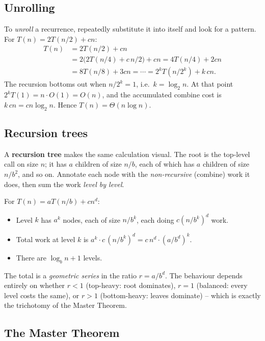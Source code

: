 \documentclass[11pt]{article}
\begin{document}
\subsection{Unrolling}

To \emph{unroll} a recurrence, repeatedly substitute it into itself and look for a pattern.
For $T(n) = 2T(n/2) + cn$:
\[
\begin{aligned}
T(n) &= 2T(n/2) + cn \\
     &= 2\bigl(2T(n/4) + c\,n/2\bigr) + cn = 4T(n/4) + 2cn \\
     &= 8T(n/8) + 3cn = \cdots = 2^k T(n/2^k) + k\,cn.
\end{aligned}
\]
The recursion bottoms out when $n/2^k = 1$, i.e.\ $k = \log_2 n$. At that point $2^k T(1) =
n \cdot O(1) = O(n)$, and the accumulated combine cost is $k\,cn = cn\log_2 n$. Hence $T(n) =
\Theta(n \log n)$.

\subsection{Recursion trees}

A \textbf{recursion tree} makes the same calculation visual. The root is the top-level call
on size $n$; it has $a$ children of size $n/b$, each of which has $a$ children of size
$n/b^2$, and so on. Annotate each node with the \emph{non-recursive} (combine) work it does,
then sum the work \emph{level by level}.

For $T(n) = aT(n/b) + cn^d$:
\begin{itemize}
    \item Level $k$ has $a^k$ nodes, each of size $n/b^k$, each doing $c(n/b^k)^d$ work.
    \item Total work at level $k$ is $a^k \cdot c\,(n/b^k)^d = c\,n^d \cdot (a/b^d)^k$.
    \item There are $\log_b n + 1$ levels.
\end{itemize}
The total is a \emph{geometric series} in the ratio $r = a/b^d$. The behaviour depends
entirely on whether $r < 1$ (top-heavy: root dominates), $r = 1$ (balanced: every level
costs the same), or $r > 1$ (bottom-heavy: leaves dominate) -- which is exactly the
trichotomy of the Master Theorem.

\subsection{The Master Theorem}
\end{document}
